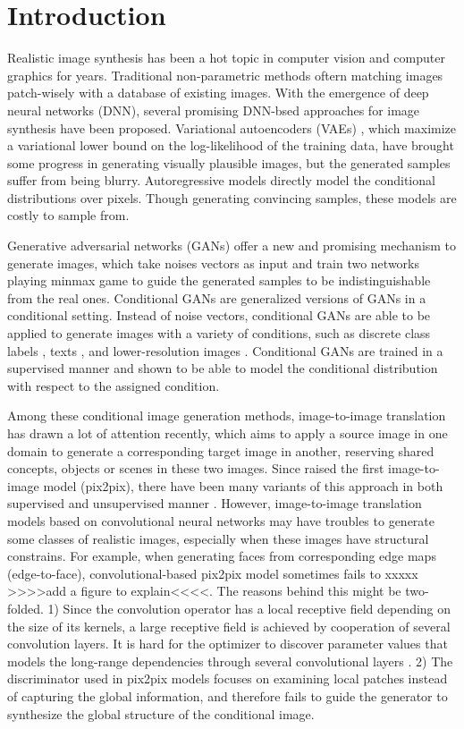 \section{Introduction}
Realistic image synthesis has been a hot topic in computer vision and computer graphics for years. Traditional non-parametric methods \cite{see DCGAN paper} oftern matching images patch-wisely with a database of existing images. With the emergence of deep neural networks (DNN), several promising DNN-bsed approaches for image synthesis have been proposed. Variational autoencoders (VAEs) \cite{VAEs}, which maximize a variational lower bound on the log-likelihood of the training data, have brought some progress in generating visually plausible images, but the generated samples suffer from being blurry. Autoregressive models \cite{PixCNN} directly model the conditional distributions over pixels. Though generating convincing samples, these models are costly to sample from.
%

Generative adversarial networks (GANs) \cite{GANs} offer a new and promising mechanism to generate images, which take noises vectors as input and train two networks playing minmax game to guide the generated samples to be indistinguishable from the real ones. 
Conditional GANs are generalized versions of GANs in a conditional setting. Instead of noise vectors, conditional GANs are able to be applied to generate images with a variety of conditions, such as discrete class labels \cite{cGANs}, texts \cite{StackGANs, StackGANs++}, and lower-resolution images \cite{SRGANs, more SR}. Conditional GANs are trained in a supervised manner and shown to be able to model the conditional distribution with respect to the assigned condition.
%

%
Among these conditional image generation methods, image-to-image translation has drawn a lot of attention recently, which aims to apply a source image in one domain to generate a corresponding target image in another, reserving shared concepts, objects or scenes in these two images. Since \cite{pix2pix}  raised the first image-to-image model (pix2pix), there have been many variants of this approach in both supervised and unsupervised manner \cite{CycleGANs, DualGANs,CoupleGANs,BicycleGANs}. However, image-to-image translation models based on convolutional neural networks may have troubles to generate some classes of realistic images, especially when these images have structural constrains. For example, when generating faces from corresponding edge maps (edge-to-face), convolutional-based pix2pix model sometimes fails to xxxxx >>>>add a figure to explain<<<<. The reasons behind this might be two-folded. 1)
Since the convolution operator has a local receptive field depending on the size of its kernels, a large receptive field is achieved by cooperation of several convolution layers. It is hard for the optimizer to discover parameter values that models the long-range dependencies through several convolutional layers \cite{SAGANs}. 2) The discriminator used in pix2pix models \cite{PatchGANs} focuses on examining local patches instead of capturing the global information, and therefore fails to guide the generator to synthesize the global structure of the conditional image. 


